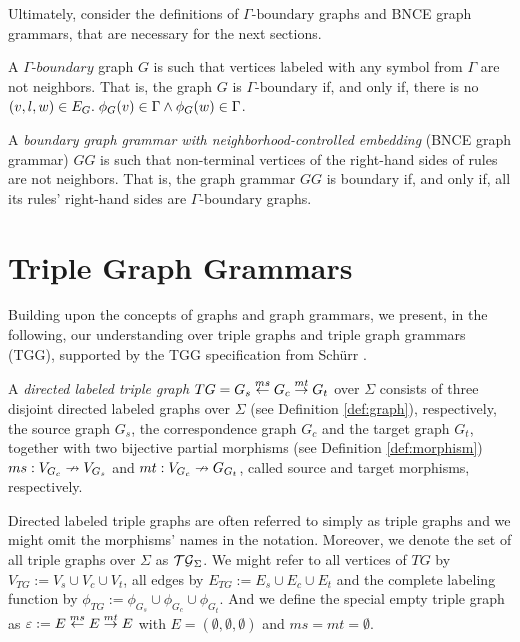Ultimately, consider the definitions of $\Gamma\text{-boundary}$ graphs and BNCE graph grammars, that are necessary for the next sections.

\begin{definition}
	A $\mathit{\Gamma\textit{-boundary}}$ graph $G$ is such that vertices labeled with any symbol from $\Gamma$ are not neighbors. That is, the graph $G$ is $\Gamma\text{-boundary}$ if, and only if, there is no $(v,l,w) \in E_G \. \phi_G(v) \in \Gamma \land \phi_G(w) \in \Gamma$.
\end{definition}

\begin{definition}
	A \emph{boundary graph grammar with neighborhood-controlled embedding} (BNCE graph grammar) $GG$ is such that non-terminal vertices of the right-hand sides of rules are not neighbors. That is, the graph grammar $GG$ is boundary if, and only if, all its rules' right-hand sides are $\Gamma\text{-boundary}$ graphs.
\end{definition}	

\section{Triple Graph Grammars}
Building upon the concepts of graphs and graph grammars, we present, in the following, our understanding over triple graphs and triple graph grammars (TGG), supported by the TGG specification from Sch\"{u}rr \cite{schurr1994specification}.

\begin{definition}
	A \emph{directed labeled triple graph} $TG = G_s \ms{ms} G_c \mt{mt} G_t$ over $\Sigma$ consists of three disjoint directed labeled graphs over $\Sigma$ (see Definition \ref{def:graph}), respectively, the source graph $G_s$, the correspondence graph $G_c$ and the target graph $G_t$, together with two bijective partial morphisms (see Definition \ref{def:morphism}) $ms: V_{G_c} \pto V_{G_s}$ and $mt : V_{G_c} \pto G_{G_t}$, called source and target morphisms, respectively. 
\end{definition}

Directed labeled triple graphs are often referred to simply as triple graphs and we might omit the morphisms' names in the notation. Moreover, we denote the set of all triple graphs over $\Sigma$ as $\alltgraphs{\Sigma}$. We might refer to all vertices of $TG$ by $V_{TG}:= V_s \cup V_c \cup V_t$, all edges by $E_{TG}:= E_s \cup E_c \cup E_t$ and the complete labeling function by $\phi_{TG}:= \phi_{G_s} \cup \phi_{G_c} \cup \phi_{G_t}$. And we define the special empty triple graph as $\emptyTG := E \ms{ms} E \mt{mt} E$ with $E = (\emptyset, \emptyset, \emptyset)$ and $ms = mt = \emptyset$.

